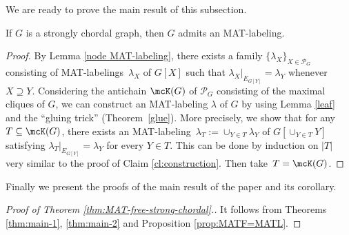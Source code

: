 We are ready to prove the main result of this subsection.
\begin{theorem}
\label{thm:main-2} 
If $ G $ is a strongly chordal graph, then $G$ admits an MAT-labeling. 
\end{theorem}
\begin{proof}
By Lemma \ref{node MAT-labeling}, there exists a family $ \{\lambda_{X}\}_{X \in \mathcal{P}_{G}} $ consisting of MAT-labelings~$ \lambda_{X} $ of $ G[X] $ such that $ \lambda_{X}|_{E_{G[Y]}} = \lambda_{Y} $ whenever $ X \supseteq Y $. 
Considering the antichain $\mcK(G)$ of $ \mathcal{P}_{G} $ consisting of the maximal cliques of $ G $, we can construct an MAT-labeling $ \lambda $ of $ G $ by using Lemma \ref{leaf} and the ``gluing trick'' (Theorem~\ref{glue}). 
More precisely, we show that for any $T \subseteq \mcK(G)$, there exists an MAT-labeling~$ \lambda_{T}:= \cup_{Y \in T} \lambda_Y$ of $ G[\cup_{Y \in T}Y] $ satisfying $ \lambda_{T}|_{E_{G[Y]}} = \lambda_{Y} $ for every $ Y \in T $. 
This can be done by induction on $ |T| $ very similar to the proof of Claim \ref{cl:construction}. 
Then take~$T = \mcK(G)$.
\end{proof}

Finally we present the proofs of the main result of the paper and its corollary. 

\begin{proof}[Proof of Theorem \ref{thm:MAT-free-strong-chordal}.]
It follows from Theorems \ref{thm:main-1}, \ref{thm:main-2} and Proposition \ref{prop:MATF=MATL}.
\end{proof}
